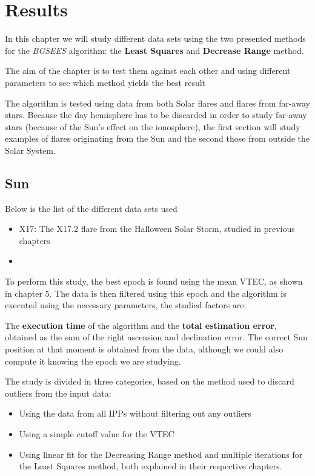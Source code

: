 \chapter{Results}

In this chapter we will study different data sets using the two presented methods for the \textit{BGSEES} algorithm: the \textbf{Least Squares} and \textbf{Decrease Range} method. 

The aim of the chapter is to test them against each other and using different parameters to see which method yields the best result

The algorithm is tested using data from both Solar flares and flares from far-away stars. Because the day hemisphere has to be discarded in order to study far-away stars (because of the Sun's effect on the ionosphere), the first section will study examples of flares originating from the Sun and the second those from outside the Solar System.

\section{Sun}

Below is the list of the different data sets used 

\begin{itemize}
	\item X17: The X17.2 flare from the Halloween Solar Storm, studied in previous chapters
	\item 
\end{itemize}

To perform this study, the best epoch is found using the mean VTEC, as shown in chapter 5. The data is then filtered using this epoch and the algorithm is executed using the necessary parameters, the studied factors are:

The \textbf{execution time} of the algorithm and the \textbf{total estimation error}, obtained as the sum of the right ascension and declination error. The correct Sun position at that moment is obtained from the data, although we could also compute it knowing the epoch we are studying.

The study is divided in three categories, based on the method used to discard outliers from the input data:

\begin{itemize}
	\item Using the data from all IPPs without filtering out any outliers
	\item Using a simple cutoff value for the VTEC
	\item Using linear fit for the Decreasing Range method and multiple iterations for the Least Squares method, both explained in their respective chapters.
\end{itemize}

